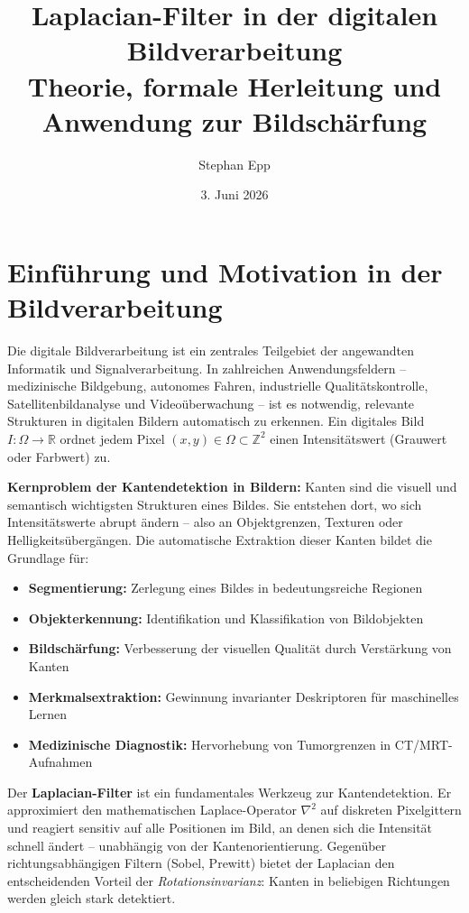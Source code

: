 ﻿\documentclass[a4paper,12pt]{article}
\title{\textbf{Laplacian-Filter in der digitalen Bildverarbeitung}\\
\large Theorie, formale Herleitung und Anwendung zur Bildschärfung}
\author{Stephan Epp\\}
\date{3. Juni 2026}
\theoremstyle{definition}
\begin{document}
\maketitle
\tableofcontents
\newpage

\section{Einführung und Motivation in der Bildverarbeitung}

Die digitale Bildverarbeitung ist ein zentrales Teilgebiet der angewandten Informatik und
Signalverarbeitung. In zahlreichen Anwendungsfeldern -- medizinische Bildgebung, autonomes
Fahren, industrielle Qualitätskontrolle, Satellitenbildanalyse und Videoüberwachung -- ist es
notwendig, relevante Strukturen in digitalen Bildern automatisch zu erkennen. Ein digitales
Bild $I: \Omega \to \mathbb{R}$ ordnet jedem Pixel $(x, y) \in \Omega \subset \mathbb{Z}^2$
einen Intensitätswert (Grauwert oder Farbwert) zu.

\textbf{Kernproblem der Kantendetektion in Bildern:} Kanten sind die visuell und semantisch
wichtigsten Strukturen eines Bildes. Sie entstehen dort, wo sich Intensitätswerte abrupt ändern
-- also an Objektgrenzen, Texturen oder Helligkeitsübergängen. Die automatische Extraktion dieser
Kanten bildet die Grundlage für:
\begin{itemize}
    \item \textbf{Segmentierung:} Zerlegung eines Bildes in bedeutungsreiche Regionen
    \item \textbf{Objekterkennung:} Identifikation und Klassifikation von Bildobjekten
    \item \textbf{Bildschärfung:} Verbesserung der visuellen Qualität durch Verstärkung von Kanten
    \item \textbf{Merkmalsextraktion:} Gewinnung invarianter Deskriptoren für maschinelles Lernen
    \item \textbf{Medizinische Diagnostik:} Hervorhebung von Tumorgrenzen in CT/MRT-Aufnahmen
\end{itemize}

Der \textbf{Laplacian-Filter} ist ein fundamentales Werkzeug zur Kantendetektion. Er approximiert
den mathematischen Laplace-Operator $\nabla^2$ auf diskreten Pixelgittern und reagiert sensitiv
auf alle Positionen im Bild, an denen sich die Intensität schnell ändert -- unabhängig von der
Kantenorientierung. Gegenüber richtungsabhängigen Filtern (Sobel, Prewitt) bietet der Laplacian
den entscheidenden Vorteil der \emph{Rotationsinvarianz}: Kanten in beliebigen Richtungen werden
gleich stark detektiert.
\end{document}
